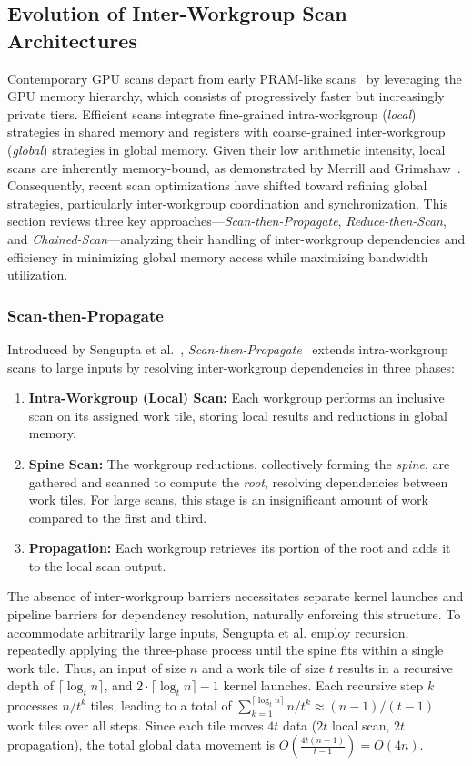 \documentclass[sigconf]{acmart}
\begin{document}
\subsection{Evolution of Inter-Workgroup Scan Architectures}
Contemporary GPU scans depart from early PRAM-like scans~\cite{Horn, Hensley, Sengupta2006, Gress} by leveraging the GPU memory hierarchy, which consists of progressively faster but increasingly private tiers. Efficient scans integrate fine-grained intra-workgroup (\emph{local}) strategies in shared memory and registers with coarse-grained inter-workgroup (\emph{global}) strategies in global memory. Given their low arithmetic intensity, local scans are inherently memory-bound, as demonstrated by Merrill and Grimshaw~\cite{Merrill2009}. Consequently, recent scan optimizations have shifted toward refining global strategies, particularly inter-workgroup coordination and synchronization. This section reviews three key approaches---\emph{Scan-then-Propagate}, \emph{Reduce-then-Scan}, and \emph{Chained-Scan}---analyzing their handling of inter-workgroup dependencies and efficiency in minimizing global memory access while maximizing bandwidth utilization.

\subsubsection{Scan-then-Propagate}
Introduced by Sengupta et al.~\cite{10.5555/1280094.1280110}, \emph{Scan-then-Propagate}~\cite{GPUGems3, Sengupta2011} extends intra-workgroup scans to large inputs by resolving inter-workgroup dependencies in three phases:
\begin{enumerate}
  \item \textbf{Intra-Workgroup (Local) Scan:}  Each workgroup performs an inclusive scan on its assigned work tile, storing local results and reductions in global memory.
  \item \textbf{Spine Scan:} The workgroup reductions, collectively forming the \emph{spine}, are gathered and scanned to compute the \emph{root}, resolving dependencies between work tiles. For large scans, this stage is an insignificant amount of work compared to the first and third.
  \item \textbf{Propagation:} Each workgroup retrieves its portion of the root and adds it to the local scan output.
\end{enumerate}
The absence of inter-workgroup barriers necessitates separate kernel launches and pipeline barriers for dependency resolution, naturally enforcing this structure. To accommodate arbitrarily large inputs, Sengupta et al. employ recursion, repeatedly applying the three-phase process until the spine fits within a single work tile. Thus, an input of size $n$ and a work tile of size $t$ results in a recursive depth of $\lceil \log_t n \rceil$, and $2\cdot\lceil \log_t n \rceil - 1$ kernel launches. Each recursive step $k$ processes $n/t^k$ tiles, leading to a total of $\sum_{k=1}^{\lceil \log_t n \rceil} n/t^k \approx (n - 1)/(t - 1)$ work tiles over all steps. Since each tile moves $4t$ data ($2t$ local scan, $2t$ propagation), the total global data movement is $O\left(\frac{4t(n - 1)}{t - 1}\right) = O(4n)$.
\end{document}
